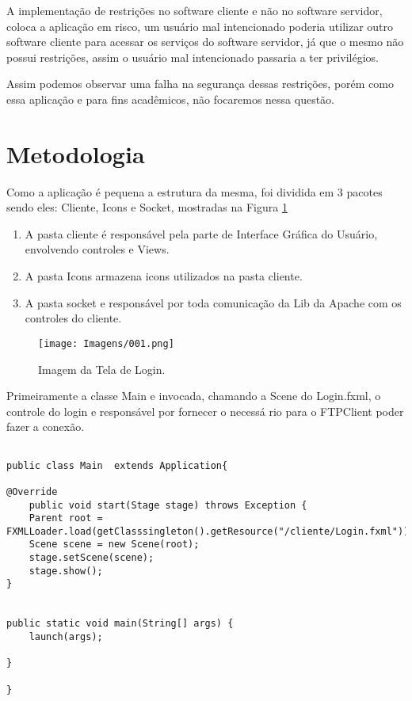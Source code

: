\documentclass[12pt]{article}
\begin{document}
A implementação de restrições no software cliente e não no software servidor, coloca a aplicação em risco, um usuário mal intencionado poderia utilizar outro software cliente para acessar os serviços do software servidor, já que o mesmo não possui restrições, assim o usuário mal intencionado passaria a ter privilégios.\cite{rocha2001qualidade}

Assim podemos observar uma falha na segurança dessas restrições, porém como essa aplicação e para fins acadêmicos, não focaremos nessa questão.


\section{Metodologia}
Como a aplicação é pequena a estrutura da mesma, foi dividida em 3 pacotes sendo eles: Cliente, Icons e Socket, mostradas na Figura \ref{fig:01}

\begin{enumerate}
	
\item{A pasta cliente é responsável pela parte de Interface Gráfica do Usuário, envolvendo controles e Views.}
\item{A pasta Icons armazena icons utilizados na pasta cliente.}
\item{A pasta socket e responsável por toda comunicação da Lib da Apache com os controles do cliente.}

\end{enumerate}

\begin{figure}[H]
	\centering
	\texttt{[image: Imagens/001.png]}
	\caption{ Imagem da Tela de Login.}
	\label{fig:01}
\end{figure}


Primeiramente a classe Main e invocada, chamando a Scene do Login.fxml, o controle do login e responsável por fornecer o necessá	rio para o FTPClient poder fazer a conexão.

\begin{lstlisting}

public class Main  extends Application{

@Override
	public void start(Stage stage) throws Exception {
	Parent root = FXMLLoader.load(getClasssingleton().getResource("/cliente/Login.fxml"));
	Scene scene = new Scene(root);
	stage.setScene(scene);
	stage.show();
}


public static void main(String[] args) {
	launch(args);

}

}

\end{lstlisting}
\end{document}
